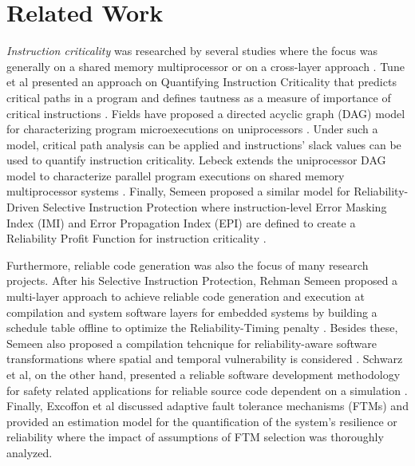\section{Related Work}\label{sec:related}

{\em Instruction criticality} was researched by several studies where the focus was generally on a shared memory multiprocessor \cite{Lebeck:2003} or on a cross-layer approach \cite{Rehman:2016}. Tune et al presented an approach on Quantifying Instruction Criticality that predicts critical paths in a program and defines tautness as a measure of importance of critical instructions \cite{Tune:2002}. Fields have proposed a directed acyclic graph (DAG) model for characterizing program microexecutions on uniprocessors \cite{Fields:2001}. Under such a model, critical path analysis can be applied and instructions' slack values can be used to quantify
instruction criticality. Lebeck extends the uniprocessor DAG model to characterize parallel program executions on shared memory multiprocessor systems \cite{Lebeck:2003}. Finally, Semeen proposed a similar model for Reliability-Driven Selective Instruction Protection where instruction-level Error Masking Index (IMI) and Error Propagation Index (EPI) are defined to create a Reliability Profit Function for instruction criticality \cite{Rehman:2016}.

 Furthermore, reliable code generation was also the focus of many research projects. After his Selective Instruction Protection, Rehman Semeen proposed a multi-layer approach to achieve reliable code generation and execution at compilation and system software layers for embedded systems by building a schedule table offline to optimize the Reliability-Timing penalty \cite{RTPenalty:2013}. Besides these, Semeen also proposed a compilation tehcnique for reliability-aware software transformations where spatial and temporal vulnerability is considered \cite{Compilation_Rehman:2014}. Schwarz et al, on the other hand, presented a reliable software development methodology for safety related applications for reliable source code dependent on a simulation \cite{Schwarz:2009}. Finally, Excoffon et al discussed adaptive fault tolerance mechanisms (FTMs) and provided an estimation model for the quantification of the system's resilience or reliability where the impact of assumptions of FTM selection was thoroughly analyzed. \cite{FTM:2017}

